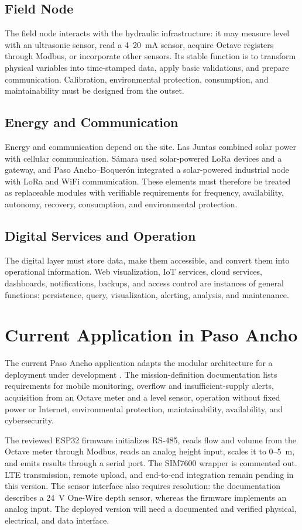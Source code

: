 \documentclass[conference]{IEEEtran}
\begin{document}
\subsection{Field Node}
The field node interacts with the hydraulic infrastructure: it may measure level with an ultrasonic sensor, read a 4--20~mA sensor, acquire Octave registers through Modbus, or incorporate other sensors. Its stable function is to transform physical variables into time-stamped data, apply basic validations, and prepare communication. Calibration, environmental protection, consumption, and maintainability must be designed from the outset.

\subsection{Energy and Communication}
Energy and communication depend on the site. Las Juntas combined solar power with cellular communication. Sámara used solar-powered LoRa devices and a gateway, and Paso Ancho--Boquerón integrated a solar-powered industrial node with LoRa and WiFi communication. These elements must therefore be treated as replaceable modules with verifiable requirements for frequency, availability, autonomy, recovery, consumption, and environmental protection.

\subsection{Digital Services and Operation}
The digital layer must store data, make them accessible, and convert them into operational information. Web visualization, IoT services, cloud services, dashboards, notifications, backups, and access control are instances of general functions: persistence, query, visualization, alerting, analysis, and maintenance.

\section{Current Application in Paso Ancho}
The current Paso Ancho application adapts the modular architecture for a deployment under development \cite{deltalabo2026repo}. The mission-definition documentation lists requirements for mobile monitoring, overflow and insufficient-supply alerts, acquisition from an Octave meter and a level sensor, operation without fixed power or Internet, environmental protection, maintainability, availability, and cybersecurity.

The reviewed ESP32 firmware initializes RS-485, reads flow and volume from the Octave meter through Modbus, reads an analog height input, scales it to 0--5~m, and emits results through a serial port. The SIM7600 wrapper is commented out. LTE transmission, remote upload, and end-to-end integration remain pending in this version. The sensor interface also requires resolution: the documentation describes a 24~V One-Wire depth sensor, whereas the firmware implements an analog input. The deployed version will need a documented and verified physical, electrical, and data interface.
\end{document}
